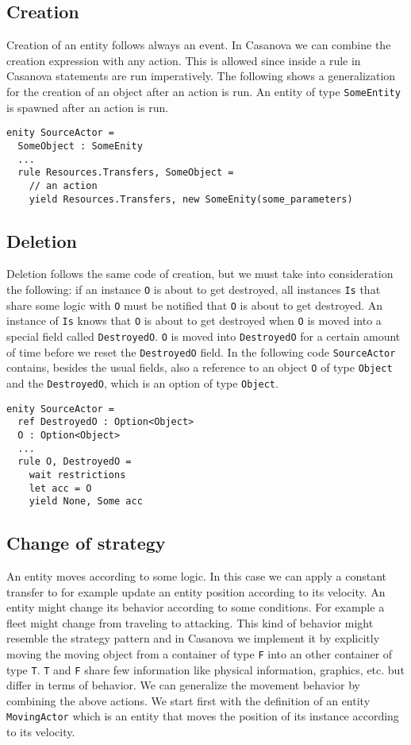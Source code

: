 \subsection{Creation}
Creation of an entity follows always an event. In Casanova we can combine the creation expression with any action. This is allowed since inside a rule in Casanova statements are run imperatively. The following shows a generalization for the creation of an object after an action is run. An entity of type \texttt{SomeEntity} is spawned after an action is run.

\begin{lstlisting}
enity SourceActor =
  SomeObject : SomeEnity
  ...
  rule Resources.Transfers, SomeObject =
    // an action
    yield Resources.Transfers, new SomeEnity(some_parameters)
\end{lstlisting}

\subsection{Deletion}
Deletion follows the same code of creation, but we must take into consideration the following: if an instance \texttt{O} is about to get destroyed, all instances \texttt{Is} that share some logic with \texttt{O} must be notified that \texttt{O} is about to get destroyed. An instance of \texttt{Is} knows that \texttt{O} is about to get destroyed when \texttt{O} is moved into a special field called \texttt{DestroyedO}. \texttt{O} is moved into \texttt{DestroyedO} for a certain amount of time before we reset the \texttt{DestroyedO} field. In the following code \texttt{SourceActor} contains, besides the usual fields, also a reference to an object \texttt{O} of type \texttt{Object} and the \texttt{DestroyedO}, which is an option of type \texttt{Object}.

\begin{lstlisting}
enity SourceActor =
  ref DestroyedO : Option<Object>
  O : Option<Object>
  ...
  rule O, DestroyedO =    
    wait restrictions
    let acc = O
    yield None, Some acc
\end{lstlisting}


\subsection{Change of strategy}
An entity moves according to some logic. In this case we can apply a constant transfer to for example update an entity position according to its velocity. An entity might change its behavior according to some conditions. For example a fleet might change from traveling to attacking. This kind of behavior might resemble the strategy pattern and in Casanova we implement it by explicitly moving the moving object from a container of type \texttt{F} into an other container of type \texttt{T}. \texttt{T} and \texttt{F} share few information like physical information, graphics, etc. but differ in terms of behavior. We can generalize the movement behavior by combining the above actions. We start first with the definition of an entity \texttt{MovingActor} which is an entity that moves the position of its instance according to its velocity.

